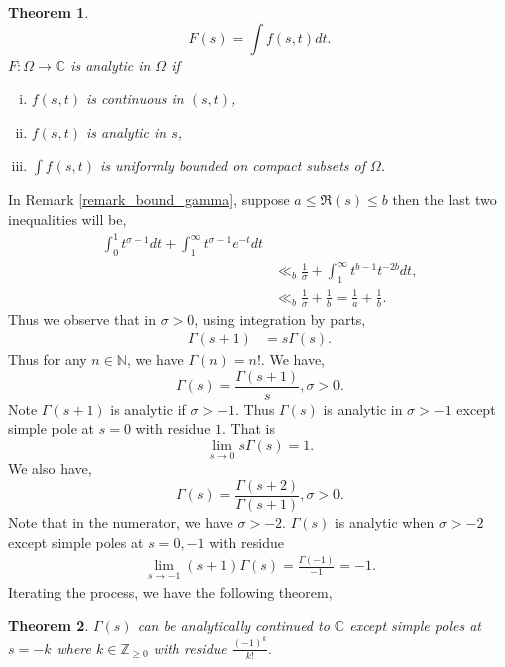 \documentclass{article}
\newtheorem{theorem}{Theorem} [section]
\newcommand{\N}[0]{\mathbb{N}}
\newcommand{\Z}[0]{\mathbb{Z}}
\newcommand{\C}[0]{\mathbb{C}}
\begin{document}
\begin{theorem}
  \begin{equation*}
    F(s) = \int f(s,t)dt.
  \end{equation*}
  $F:\Omega\to \C$ is analytic in $\Omega$ if 
  \begin{enumerate}[i).]
    \item $f(s,t)$ is continuous in $(s,t)$,
    \item $f(s,t)$ is analytic in $s$,
    \item $\int f(s,t)$ is uniformly bounded on compact subsets of $\Omega$.
  \end{enumerate}
\end{theorem}
In Remark \ref{remark_bound_gamma}, suppose $a\leq\Re(s)\leq b$ then the last two inequalities will be,
\begin{align*}
  \int_0^1t^{\sigma-1}dt + \int_1^\infty t^{\sigma-1}e^{-t}dt&\\
    &\ll _b {\frac 1 \sigma}+\int_1^\infty t^{b-1}t^{-2b}dt,\\
    &\ll _b {\frac 1 \sigma}+{\frac 1 b} = {\frac 1 a}+{\frac 1 b}.
\end{align*}
Thus we observe that in $\sigma>0$, using integration by parts,
\begin{align*}
  \Gamma(s+1) & = s\Gamma(s).
\end{align*}
Thus for any $n\in\N$, we have $\Gamma(n) = n!$.
We have,
\begin{equation*}
  \Gamma(s) = {\frac {\Gamma(s+1)} s},\sigma>0.
\end{equation*}
Note $\Gamma(s+1)$ is analytic if $\sigma>-1$. Thus $\Gamma(s)$ is analytic in $\sigma>-1$ except simple pole at $s=0$ with residue $1$. That is 
\begin{equation*}
  \lim_{s\to0}s\Gamma(s) = 1. 
\end{equation*}
We also have,
\begin{equation*}
  \Gamma(s) = {\frac {\Gamma(s+2)} {\Gamma(s+1)}},\sigma>0.
\end{equation*}
Note that in the numerator, we have $\sigma>-2$. $\Gamma(s)$ is analytic when $\sigma>-2$ except simple poles at $s=0,-1$ with residue 
\begin{align*}
  \lim_{s\to-1}(s+1)\Gamma(s) = {\frac {\Gamma(-1)} {-1}} = -1.
\end{align*}
Iterating the process, we have the following theorem,
\begin{theorem}
  \label{theorem_analytic_continuation_gamma}
  $\Gamma(s)$ can be analytically continued to $\C$ except simple poles at $s = -k$ where $k\in\Z_{\geq 0}$ with residue ${\frac {(-1)^k} {k!}}$.
\end{theorem}
\end{document}
